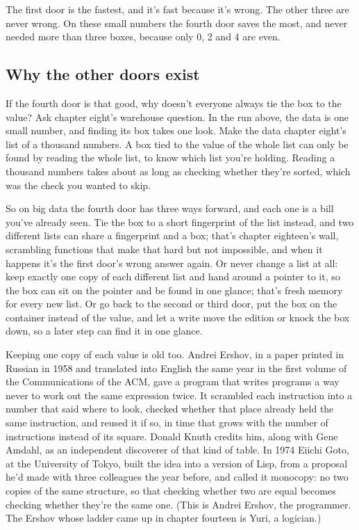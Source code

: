 \documentclass[11pt,twoside]{article}
\theoremstyle{thielethm}
\theoremstyle{thieledef}
\theoremstyle{thieledef}
\theoremstyle{thieledef}
\theoremstyle{thielethm}
\theoremstyle{thieleobs}
\theoremstyle{thielethm}
\begin{document}
The first door is the fastest, and it's fast because it's wrong. The other three are never wrong. On these small numbers the fourth door saves the most, and never needed more than three boxes, because only 0, 2 and 4 are even.

\subsection{Why the other doors exist}

If the fourth door is that good, why doesn't everyone always tie the box to the value? Ask chapter eight's warehouse question. In the run above, the data is one small number, and finding its box takes one look. Make the data chapter eight's list of a thousand numbers. A box tied to the value of the whole list can only be found by reading the whole list, to know which list you're holding. Reading a thousand numbers takes about as long as checking whether they're sorted, which was the check you wanted to skip.

So on big data the fourth door has three ways forward, and each one is a bill you've already seen. Tie the box to a short fingerprint of the list instead, and two different lists can share a fingerprint and a box; that's chapter eighteen's wall, scrambling functions that make that hard but not impossible, and when it happens it's the first door's wrong answer again. Or never change a list at all: keep exactly one copy of each different list and hand around a pointer to it, so the box can sit on the pointer and be found in one glance; that's fresh memory for every new list. Or go back to the second or third door, put the box on the container instead of the value, and let a write move the edition or knock the box down, so a later step can find it in one glance.

Keeping one copy of each value is old too. Andrei Ershov, in a paper printed in Russian in 1958 and translated into English the same year in the first volume of the Communications of the ACM, gave a program that writes programs a way never to work out the same expression twice. It scrambled each instruction into a number that said where to look, checked whether that place already held the same instruction, and reused it if so, in time that grows with the number of instructions instead of its square. Donald Knuth credits him, along with Gene Amdahl, as an independent discoverer of that kind of table. In 1974 Eiichi Goto, at the University of Tokyo, built the idea into a version of Lisp, from a proposal he'd made with three colleagues the year before, and called it monocopy: no two copies of the same structure, so that checking whether two are equal becomes checking whether they're the same one. (This is Andrei Ershov, the programmer. The Ershov whose ladder came up in chapter fourteen is Yuri, a logician.)
\end{document}
